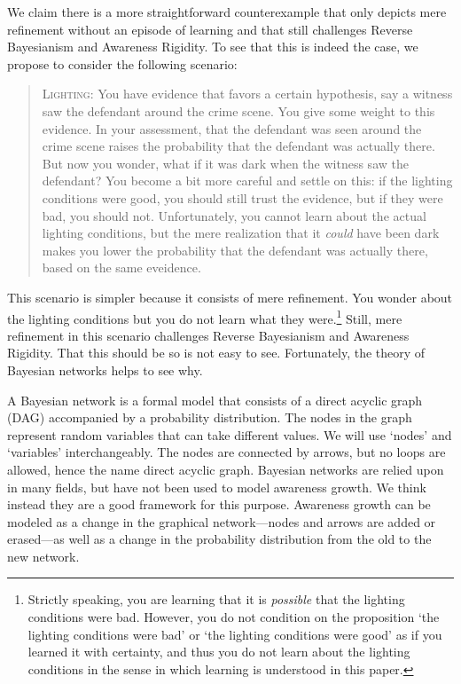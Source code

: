 \documentclass[
  11pt,
  dvipsnames,enabledeprecatedfontcommands]{scrartcl}
\begin{document}
\label{sec:better}

We claim there is a more straightforward counterexample that only
depicts mere refinement without an episode of learning and that still
challenges Reverse Bayesianism and Awareness Rigidity. To see that this
is indeed the case, we propose to consider the following scenario:

\begin{quote}
\textsc{Lighting:} You have evidence that favors a certain hypothesis,
say a witness saw the defendant around the crime scene. You give some
weight to this evidence. In your assessment, that the defendant was seen
around the crime scene raises the probability that the defendant was
actually there. But now you wonder, what if it was dark when the witness
saw the defendant? You become a bit more careful and settle on this: if
the lighting conditions were good, you should still trust the evidence,
but if they were bad, you should not. Unfortunately, you cannot learn
about the actual lighting conditions, but the mere realization that it
\textit{could} have been dark makes you lower the probability that the
defendant was actually there, based on the same eveidence.
\end{quote}

\noindent This scenario is simpler because it consists of mere
refinement. You wonder about the lighting conditions but you do not
learn what they were.\footnote{Strictly speaking, you are learning that
  it is \emph{possible} that the lighting conditions were bad. However,
  you do not condition on the proposition `the lighting conditions were
  bad' or `the lighting conditions were good' as if you learned it with
  certainty, and thus you do not learn about the lighting conditions in
  the sense in which learning is understood in this paper.} Still, mere
refinement in this scenario challenges Reverse Bayesianism and Awareness
Rigidity. That this should be so is not easy to see. Fortunately, the
theory of Bayesian networks helps to see why.

A Bayesian network is a formal model that consists of a direct acyclic
graph (DAG) accompanied by a probability distribution. The nodes in the
graph represent random variables that can take different values. We will
use `nodes' and `variables' interchangeably. The nodes are connected by
arrows, but no loops are allowed, hence the name direct acyclic graph.
Bayesian networks are relied upon in many fields, but have not been used
to model awareness growth. We think instead they are a good framework
for this purpose. Awareness growth can be modeled as a change in the
graphical network---nodes and arrows are added or erased---as well as a
change in the probability distribution from the old to the new network.
\end{document}
